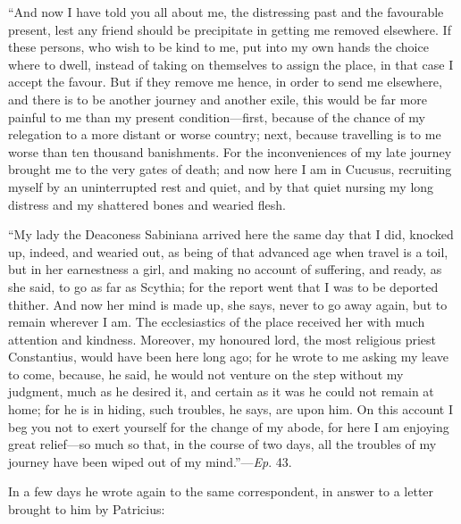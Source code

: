 ``And now I have told you all about me, the distressing past
and the favourable present, lest any friend should be precipitate in
getting me removed elsewhere. If these persons, who wish to be kind to
me, put into my own hands the choice where to dwell, instead of taking
on themselves to assign the place, in that case I accept the favour.
But if they remove me hence, in order to send me elsewhere, and there
is to be another journey and another exile, this would be far more
painful to me than my present condition—first, because of the chance
of my relegation to a more distant or worse country; next, because
travelling is to me worse than ten thousand banishments. For the
inconveniences of my late journey brought me to the very gates of
death; and now here I am in Cucusus, recruiting myself by an
uninterrupted rest and quiet, and by that quiet nursing my long
distress and my shattered bones and wearied flesh.

``My lady the Deaconess Sabiniana arrived here the same day
that I did, knocked up, indeed, and wearied out, as being of that
advanced age when travel is a toil, but in her earnestness a girl, and
making no account of suffering, and ready, as she said, to go as far
as Scythia; for the report went that I was to be deported thither. And
now her mind is made up, she says, never to go away again, but to
remain wherever I am. The ecclesiastics of the place received her with
much attention and kindness. Moreover, my honoured lord, the most
religious priest Constantius, would have been here long ago; for he
wrote to me asking my leave to come, because, he said, he would not
venture on the step without my judgment, much as he desired it, and
certain as it was he could not remain at home; for he is in hiding,
such troubles, he says, are upon him. On this account I beg you not to
exert yourself for the change of my abode, for here I am enjoying
great relief—so much so that, in the course of two days, all the
troubles of my journey have been wiped out of my mind.''—\emph{Ep}.
43.

In a few days he wrote again to the same correspondent, in answer
to a letter brought to him by Patricius:

